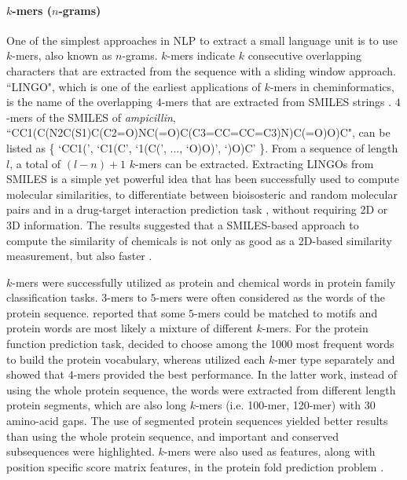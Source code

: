 \documentclass[review]{elsarticle}
\begin{document}
\paragraph{$k$-mers ($n$-grams)} One of the simplest approaches in NLP to extract a small language unit is to use $k$-mers, also known as $n$-grams. $k$-mers indicate $k$ consecutive overlapping characters that are extracted from the sequence with a sliding window approach. ``LINGO", which is one of the earliest applications of $k$-mers in cheminformatics, is the name of the overlapping $4$-mers that are extracted from SMILES strings \cite{vidal2005}. $4$-mers of the SMILES of \textit{ampicillin}, ``CC1(C(N2C(S1)C(C2=O)NC(=O)C(C3=CC=CC=C3)N)C(=O)O)C", can be listed as \{ `CC1(', `C1(C', `1(C(', ..., `O)O)', `)O)C' \}. From a sequence of length $l$, a total of $(l-n)+1$ $k$-mers can be extracted. Extracting LINGOs from SMILES is a simple yet powerful idea that has been successfully used to compute molecular similarities, to differentiate between bioisosteric and random molecular pairs \cite{vidal2005} and in a drug-target interaction prediction task \cite{ozturk2016comparative}, without requiring 2D or 3D information. The results suggested that a SMILES-based approach to compute the similarity of chemicals is not only as good as a 2D-based similarity measurement, but also faster \cite{ozturk2016comparative}. 

$k$-mers were successfully utilized as protein \cite{asgari2015continuous} and chemical words \cite{ozturk2018novel} in protein family classification tasks. $3$-mers to $5$-mers were often considered as the words of the protein sequence. \citet{motomura2012word} reported that  some $5$-mers could be matched to motifs and  protein words are most likely a mixture of different $k$-mers. For the protein function prediction task, \citet{cao2017prolango} decided to choose among the 1000 most frequent words to build the protein vocabulary, whereas \citet{ranjan2019deep} utilized each $k$-mer type separately and showed that $4$-mers provided the best performance. In the latter work, instead of using the whole protein sequence, the words were extracted from different length protein segments, which are also long $k$-mers (i.e. 100-mer, 120-mer) with 30 amino-acid gaps. The use of segmented protein sequences yielded better results than using the whole protein sequence, and important and conserved subsequences were highlighted. $k$-mers were also used as features, along with position specific score matrix features, in the protein fold prediction problem \cite{wei2015enhanced}. 
\end{document}
